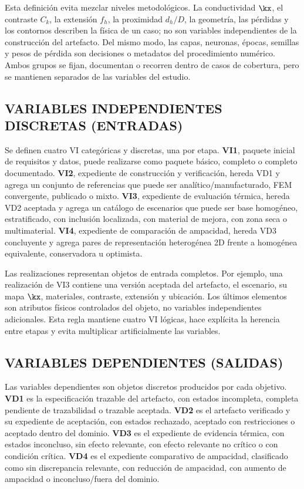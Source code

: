 Esta definición evita mezclar niveles metodológicos. La conductividad $\kx$, el contraste $C_k$, la extensión $f_h$, la proximidad $d_h/D$, la geometría, las pérdidas y los contornos describen la física de un caso; no son variables independientes de la construcción del artefacto. Del mismo modo, las capas, neuronas, épocas, semillas y pesos de pérdida son decisiones o metadatos del procedimiento numérico. Ambos grupos se fijan, documentan o recorren dentro de casos de cobertura, pero se mantienen separados de las variables del estudio.

\subsection{VARIABLES INDEPENDIENTES DISCRETAS (ENTRADAS)}

Se definen cuatro VI categóricas y discretas, una por etapa. \textbf{VI1}, paquete inicial de requisitos y datos, puede realizarse como paquete básico, completo o completo documentado. \textbf{VI2}, expediente de construcción y verificación, hereda VD1 y agrega un conjunto de referencias que puede ser analítico/manufacturado, FEM convergente, publicado o mixto. \textbf{VI3}, expediente de evaluación térmica, hereda VD2 aceptada y agrega un catálogo de escenarios que puede ser base homogéneo, estratificado, con inclusión localizada, con material de mejora, con zona seca o multimaterial. \textbf{VI4}, expediente de comparación de ampacidad, hereda VD3 concluyente y agrega pares de representación heterogénea 2D frente a homogénea equivalente, conservadora u optimista.

Las realizaciones representan objetos de entrada completos. Por ejemplo, una realización de VI3 contiene una versión aceptada del artefacto, el escenario, su mapa $\kx$, materiales, contraste, extensión y ubicación. Los últimos elementos son atributos físicos controlados del objeto, no variables independientes adicionales. Esta regla mantiene cuatro VI lógicas, hace explícita la herencia entre etapas y evita multiplicar artificialmente las variables.

\subsection{VARIABLES DEPENDIENTES (SALIDAS)}

Las variables dependientes son objetos discretos producidos por cada objetivo. \textbf{VD1} es la especificación trazable del artefacto, con estados incompleta, completa pendiente de trazabilidad o trazable aceptada. \textbf{VD2} es el artefacto verificado y su expediente de aceptación, con estados rechazado, aceptado con restricciones o aceptado dentro del dominio. \textbf{VD3} es el expediente de evidencia térmica, con estados inconcluso, sin efecto relevante, con efecto relevante no crítico o con condición crítica. \textbf{VD4} es el expediente comparativo de ampacidad, clasificado como sin discrepancia relevante, con reducción de ampacidad, con aumento de ampacidad o inconcluso/fuera del dominio.

